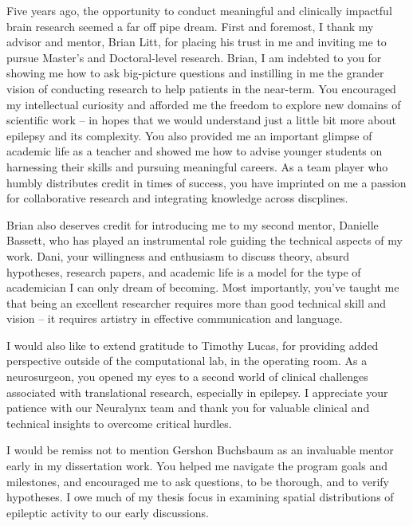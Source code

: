 
\begin{acknowledgements}
Five years ago, the opportunity to conduct meaningful and clinically impactful brain research seemed a far off pipe dream. First and foremost, I thank my advisor and mentor, Brian Litt, for placing his trust in me and inviting me to pursue Master's and Doctoral-level research. Brian, I am indebted to you for showing me how to ask big-picture questions and instilling in me the grander vision of conducting research to help patients in the near-term. You encouraged my intellectual curiosity and afforded me the freedom to explore new domains of scientific work -- in hopes that we would understand just a little bit more about epilepsy and its complexity. You also provided me an important glimpse of academic life as a teacher and showed me how to advise younger students on harnessing their skills and pursuing meaningful careers. As a team player who humbly distributes credit in times of success, you have imprinted on me a passion for collaborative research and integrating knowledge across discplines.

Brian also deserves credit for introducing me to my second mentor, Danielle Bassett, who has played an instrumental role guiding the technical aspects of my work. Dani, your willingness and enthusiasm to discuss theory, absurd hypotheses, research papers, and academic life is a model for the type of academician I can only dream of becoming. Most importantly, you've taught me that being an excellent researcher requires more than good technical skill and vision -- it requires artistry in effective communication and language.

I would also like to extend gratitude to Timothy Lucas, for providing added perspective outside of the computational lab, in the operating room. As a neurosurgeon, you opened my eyes to a second world of clinical challenges associated with translational research, especially in epilepsy. I appreciate your patience with our Neuralynx team and thank you for valuable clinical and technical insights to overcome critical hurdles.

I would be remiss not to mention Gershon Buchsbaum as an invaluable mentor early in my dissertation work. You helped me navigate the program goals and milestones, and encouraged me to ask questions, to be thorough, and to verify hypotheses. I owe much of my thesis focus in examining spatial distributions of epileptic activity to our early discussions.


\end{acknowledgements}
